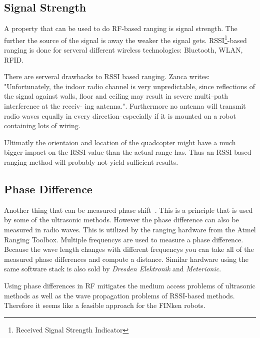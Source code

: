 \subsection{Signal Strength}

A property that can be used to do RF-based ranging is signal strength.
The further the source of the signal is away the weaker the signal gets.
RSSI\footnote{Received Signal Strength Indicator}-based ranging is done for serveral different wireless technologies: Bluetooth\cite{pei_using_2010}, WLAN\cite{wlanrssi, wlanrssi2}, RFID\cite{rfidrssi}.

There are serveral drawbacks to RSSI based ranging. Zanca \cite{Zanca} writes: "Unfortunately, the indoor radio channel is very
unpredictable, since reflections of the signal against walls, floor and ceiling may result in severe multi–path interference at the receiv-
ing antenna.".
Furthermore no antenna will transmit radio waves equally in every direction–especially if it is mounted on a robot containing lots of wiring.

Ultimatly the orientaion and location of the quadcopter might have a much bigger impact on the RSSI value than the actual range has.
Thus an RSSI based ranging method will probably not yield sufficient results.


\subsection{Phase Difference}

Another thing that can be measured phase shift~\cite{2_kluge_eggert_2009}.
This is a principle that is used by some of the ultrasonic methods.
However the phase difference can also be measured in radio waves.
This is utilized by the ranging hardware from the Atmel Ranging Toolbox.
Multiple frequencys are used to measure a phase difference.
Because the wave length changes with different frequencys you can take all of the measured phase differences and compute a distance.
Similar hardware using the same software stack is also sold by \emph{Dresden Elektronik} and \emph{Meterionic}.

Using phase differences in RF mitigates the medium access problems of ultrasonic methods as well as the wave propagation problems of RSSI-based methods.
Therefore it seems like a feasible approach for the FINken robots.

